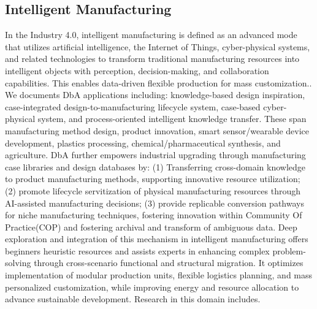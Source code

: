 \subsection{Intelligent Manufacturing} %
In the Industry 4.0, intelligent manufacturing is defined as an advanced mode that utilizes artificial intelligence, the Internet of Things, cyber-physical systems, and related technologies to transform traditional manufacturing resources into intelligent objects with perception, decision-making, and collaboration capabilities. This enables data-driven flexible production for mass customization.\cite{zhong2017intelligent, jiang2022data, li2017applications}. We documents DbA applications including: knowledge-based design inspiration\cite{kang2025biospark}, case-integrated design-to-manufacturing lifecycle system\cite{thomas2013extending, schulz2014design}, case-based cyber-physical system\cite{gonzalez2018energy}, and process-oriented intelligent knowledge transfer\cite{emerson2024anther}. These span manufacturing method design\cite{luo2019computer}, product innovation\cite{liu2023smfm}, smart sensor/wearable device development\cite{hong2024fishbone}, plastics processing\cite{khosravani2022intelligent}, chemical/pharmaceutical synthesis\cite{coley2019robotic}, and agriculture\cite{zhai2020applying}. DbA further empowers industrial upgrading through manufacturing case libraries and design databases by: (1) Transferring cross-domain knowledge to product manufacturing methods, supporting innovative resource utilization; (2) promote lifecycle servitization of physical manufacturing resources through AI-assisted manufacturing decisions; (3) provide replicable conversion pathways for niche manufacturing techniques, fostering innovation within Community Of Practice(COP) and fostering archival and transform of ambiguous data\cite{zhong2017intelligent, kusiak2000computational, jiang2022data}. Deep exploration and integration of this mechanism in intelligent manufacturing offers beginners heuristic resources and assists experts in enhancing complex problem-solving through cross-scenario functional and structural migration. It optimizes implementation of modular production units, flexible logistics planning, and mass personalized customization\cite{li2017applications}, while improving energy and resource allocation to advance sustainable development. Research in this domain includes\cite{kang2025biospark, emerson2024anther, zhai2020applying, fan2014fractal, luo2021guiding, schulz2014design, liu2023smfm, luo2019computer, hong2024fishbone, khosravani2022intelligent, you2018design, thomas2013extending, coley2019robotic, gonzalez2018energy}.
